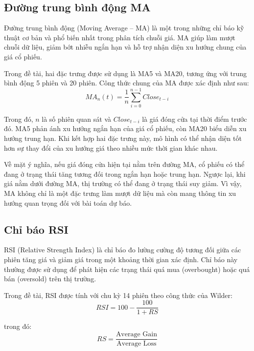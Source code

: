 \subsection{Đường trung bình động MA}

Đường trung bình động (Moving Average -- MA) là một trong những chỉ báo kỹ thuật cơ bản và phổ biến nhất trong phân tích chuỗi giá. MA giúp làm mượt chuỗi dữ liệu, giảm bớt nhiễu ngắn hạn và hỗ trợ nhận diện xu hướng chung của giá cổ phiếu.

Trong đề tài, hai đặc trưng được sử dụng là MA5 và MA20, tương ứng với trung bình động 5 phiên và 20 phiên. Công thức chung của MA được xác định như sau:
\begin{equation}
    MA_n(t) = \frac{1}{n} \sum_{i=0}^{n-1} Close_{t-i}
\end{equation}

Trong đó, $n$ là số phiên quan sát và $Close_{t-i}$ là giá đóng cửa tại thời điểm trước đó. MA5 phản ánh xu hướng ngắn hạn của giá cổ phiếu, còn MA20 biểu diễn xu hướng trung hạn. Khi kết hợp hai đặc trưng này, mô hình có thể nhận diện tốt hơn sự thay đổi của xu hướng giá theo nhiều mức thời gian khác nhau.

Về mặt ý nghĩa, nếu giá đóng cửa hiện tại nằm trên đường MA, cổ phiếu có thể đang ở trạng thái tăng tương đối trong ngắn hạn hoặc trung hạn. Ngược lại, khi giá nằm dưới đường MA, thị trường có thể đang ở trạng thái suy giảm. Vì vậy, MA không chỉ là một đặc trưng làm mượt dữ liệu mà còn mang thông tin xu hướng quan trọng đối với bài toán dự báo.

\subsection{Chỉ báo RSI}

RSI (Relative Strength Index) là chỉ báo đo lường cường độ tương đối giữa các phiên tăng giá và giảm giá trong một khoảng thời gian xác định. Chỉ báo này thường được sử dụng để phát hiện các trạng thái quá mua (overbought) hoặc quá bán (oversold) trên thị trường.

Trong đề tài, RSI được tính với chu kỳ 14 phiên theo công thức của Wilder:
\begin{equation}
    RSI = 100 - \frac{100}{1 + RS}
\end{equation}

trong đó:
\begin{equation}
    RS = \frac{\text{Average Gain}}{\text{Average Loss}}
\end{equation}

